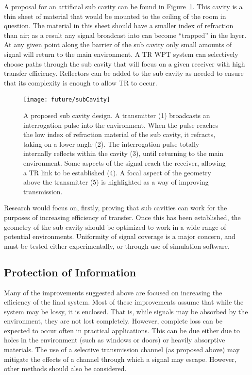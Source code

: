 A proposal for an artificial sub cavity can be found in Figure~\ref{fig:subCav}. This cavity is a thin sheet of material that would be mounted to the ceiling of the room in question. The material in this sheet should have a smaller index of refraction than air; as a result any signal broadcast into can become ``trapped'' in the layer. At any given point along the barrier of the sub cavity only small amounts of signal will return to the main environment. A TR WPT system can selectively choose paths through the sub cavity that will focus on a given receiver with high transfer efficiency. Reflectors can be added to the sub cavity as needed to ensure that its complexity is enough to allow TR to occur.

\begin{figure}[h]
\centering
\texttt{[image: future/subCavity]}
\caption[Proposed ``Sub Cavity Design'']{A proposed sub cavity design. A transmitter (1) broadcasts an interrogation pulse into the environment. When the pulse reaches the low index of refraction material of the sub cavity, it refracts, taking on a lower angle (2). The interrogation pulse totally internally reflects within the cavity (3), until returning to the main environment. Some aspects of the signal reach the receiver, allowing a TR link to be established (4). A focal aspect of the geometry above the transmitter (5) is highlighted as a way of improving transmission.}
\label{fig:subCav}
\end{figure}

Research would focus on, firstly, proving that sub cavities can work for the purposes of increasing efficiency of transfer. Once this has been established, the geometry of the sub cavity should be optimized to work in a wide range of potential environments. Uniformity of signal coverage is a major concern, and must be tested either experimentally, or through use of simulation software.

\subsection{Protection of Information}
Many of the improvements suggested above are focused on increasing the efficiency of the final system. Most of these improvements assume that while the system may be lossy, it is enclosed. That is, while signals may be absorbed by the environment, they are not lost completely. However, complete loss can be expected to occur often in practical applications. This can be due either due to holes in the environment (such as windows or doors) or heavily absorptive materials. The use of a selective transmission channel (as proposed above) may mitigate the effects of a channel through which a signal may escape. However, other methods should also be considered.

